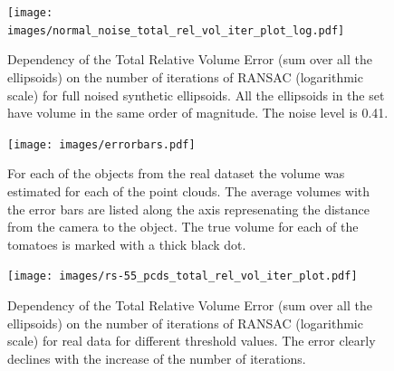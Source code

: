 

\begin{figure}[!htb]
  \centering
      \texttt{[image: images/normal\_noise\_total\_rel\_vol\_iter\_plot\_log.pdf]}
      \caption{Dependency of the Total Relative Volume Error (sum over all the ellipsoids) on the number of iterations of RANSAC (logarithmic scale) for full noised synthetic ellipsoids. All the ellipsoids in the set have volume in the same order of magnitude. The noise level is 0.41.}
      \label{fig:normal_noise_total_rel_vol_iter_plot_log}
\end{figure}

\begin{figure}[!htb]
  \centering
      \texttt{[image: images/errorbars.pdf]}
      \caption{For each of the objects from the real dataset the volume was estimated for each of the point clouds.
      The average volumes with the error bars are listed along the axis represenating the distance from the camera to the object.
      The true volume for each of the tomatoes is marked with a thick black dot.}
      \label{fig:errorbars}
\end{figure}

\begin{figure}[!htb]
  \centering
      \texttt{[image: images/rs-55\_pcds\_total\_rel\_vol\_iter\_plot.pdf]}
      \caption{Dependency of the Total Relative Volume Error (sum over all the ellipsoids) on the number of iterations of RANSAC (logarithmic scale) for real data for different threshold values. The error clearly declines with the increase of the number of iterations.}
      \label{fig:wood_rs-55_pcds_total_rel_vol_iter_plot}
\end{figure}

